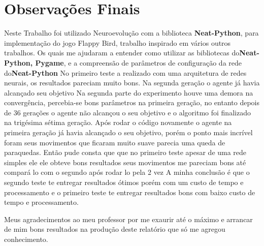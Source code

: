 \section{Observações Finais}\label{sec:conclusion}
Neste Trabalho foi utilizado Neuroevolução com a biblioteca \textbf{Neat-Python}, para implementação do jogo Flappy Bird, trabalho inspirado em vários outros trabalhos.\cite{Cheesy}\cite{CodeBucket}\cite{CodeBucket}\cite{GamePlaying}
Os quais me ajudaram a entender como utilizar as bibliotecas do\textbf{Neat-Python, Pygame}, e a compreensão de parâmetros de configuração da rede do\textbf{Neat-Python}
No primeiro teste a realizado com uma arquitetura de redes neurais,
os resultados pareciam muito bons.
Na segunda geração o agente já havia alcançado seu objetivo
Na segunda parte do experimento houve uma demora na convergência,
percebia-se bons parâmetros na primeira geração, no entanto depois de 36 gerações
o agente não alcançou o seu objetivo e o algoritmo foi finalizado na trigésima sétima geração.
Após rodar o código novamente o agente na primeira geração já havia alcançado o seu objetivo, porém o ponto mais incrível foram seus movimentos que ficaram muito suave
parecia uma queda de paraquedas.
Então pude consta que que no primeiro teste  apesar de uma rede simples ele ele obteve bons resultados seus movimentos me pareciam bons até compará lo com o segundo
após rodar lo pela 2 vez
A minha conclusão é que o segundo teste te entregar resultados ótimos porém com um custo de tempo e processamento e o primeiro teste te entregar resultados bons com baixo custo de tempo e processamento.


Meus agradecimentos ao meu professor por me exaurir até o máximo e arrancar de mim bons resultados na produção deste relatório que só me agregou conhecimento.


